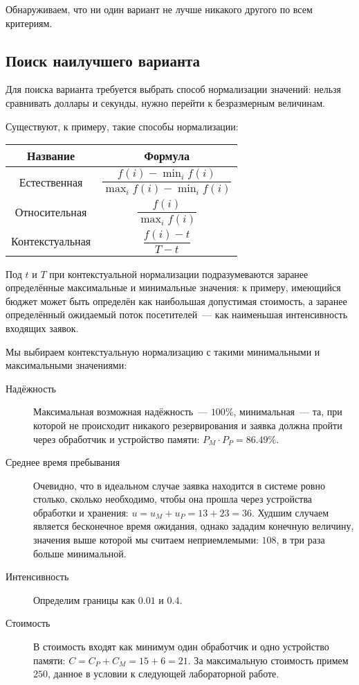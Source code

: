 \documentclass[12pt, a4paper] {ncc}
\begin{document}
Обнаруживаем, что ни один вариант не лучше никакого другого по всем критериям.

\subsection{Поиск наилучшего варианта}

Для поиска варианта требуется выбрать способ нормализации значений: нельзя
сравнивать доллары и секунды, нужно перейти к безразмерным величинам.

Существуют, к примеру, такие способы нормализации:

\begin{tabular}{|c|c|}
\hline
\bf Название & \bf Формула \\ \hline
Естественная & $\dfrac{f(i) - \min_i f(i)}{\max_i f(i) - \min_i f(i)}$ \\ \hline
Относительная & $\dfrac{f(i)}{\max_i f(i)}$ \\ \hline
Контекстуальная & $\dfrac{f(i) - t}{T - t}$ \\ \hline
\end{tabular}

Под $t$ и $T$ при контекстуальной нормализации подразумеваются заранее
определённые максимальные и минимальные значения: к примеру, имеющийся бюджет
может быть определён как наибольшая допустимая стоимость, а заранее определённый
ожидаемый поток посетителей~--- как наименьшая интенсивность входящих заявок.

Мы выбираем контекстуальную нормализацию с такими минимальными и максимальными
значениями:

\begin{description}
\item[Надёжность] Максимальная возможная надёжность~--- $100\%$, минимальная~---
та, при которой не происходит никакого резервирования и заявка должна пройти
через обработчик и устройство памяти: $P_M \cdot P_P = 86.49\%$.
\item[Среднее время пребывания] Очевидно, что в идеальном случае заявка
находится в системе ровно столько, сколько необходимо, чтобы она прошла через
устройства обработки и хранения: $u = u_M + u_P = 13 + 23 = 36$. Худшим случаем
является бесконечное время ожидания, однако зададим конечную величину, значения
выше которой мы считаем неприемлемыми: $108$, в три раза больше минимальной.
\item[Интенсивность] Определим границы как $0.01$ и $0.4$.
\item[Стоимость] В стоимость входят как минимум один обработчик и одно
устройство памяти: $C = C_P + C_M = 15 + 6 = 21$. За максимальную стоимость
примем $250$, данное в условии к следующей лабораторной работе.
\end{description}
\end{document}
